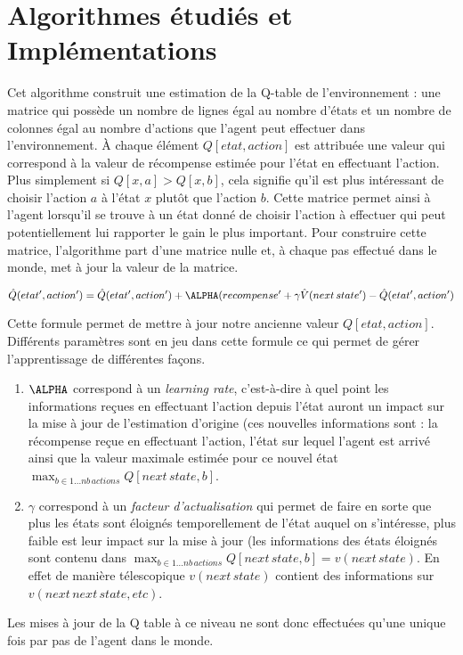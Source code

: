 \documentclass{article}
\begin{document}
\section{Algorithmes étudiés et Implémentations}
Cet algorithme construit une estimation de la Q-table de l’environnement : une matrice qui possède un nombre de lignes égal au nombre d’états et un nombre de colonnes égal au nombre d’actions que l’agent peut effectuer dans l’environnement. À chaque élément $Q[etat, action]$ est attribuée une valeur qui correspond à la valeur de récompense estimée pour l’état en effectuant l’action. Plus simplement si $Q[x,a] > Q[x,b]$, cela signifie qu’il est plus intéressant de choisir l’action $a$ à l’état $x$ plutôt que l’action $b$. 
Cette matrice permet ainsi à l’agent lorsqu’il se trouve à un état donné de choisir l’action à effectuer qui peut potentiellement lui rapporter le gain le plus important. Pour construire cette matrice, l’algorithme part d’une matrice nulle et, à chaque pas effectué dans le monde, met à jour la valeur de la matrice.

$$\hat{Q}(etat',action')=\hat{Q}(etat',action')+\ALPHA(recompense'+\gamma\hat{V}(next\,state')-\hat{Q}(etat',action')$$    %

Cette formule permet de mettre à jour notre ancienne valeur $Q[etat, action]$. Différents paramètres sont en jeu dans cette formule ce qui permet de gérer l’apprentissage de différentes façons. 
\begin{enumerate}
    \item $\ALPHA$ correspond à un \textit{learning rate}, c'est-à-dire à quel point les informations reçues en effectuant l’action depuis l’état auront un impact sur la mise à jour de l’estimation d’origine (ces nouvelles informations sont : la récompense reçue en effectuant l’action, l’état sur lequel l’agent est arrivé ainsi que la valeur maximale estimée pour ce nouvel état $\max_{b\in1...nb\,actions}Q[next\,state,b]$. 
    \item $\gamma$ correspond à un \textit{facteur d'actualisation} qui permet de faire en sorte que plus les états sont éloignés temporellement de l’état auquel on s’intéresse, plus faible est leur impact sur la mise à jour (les informations des états éloignés sont contenu dans $\max_{b\in1...nb\,actions}Q[next\,state,b]=v(next\,state)$. En effet de manière télescopique $v(next\,state)$ contient des informations sur $v(next\,next\,state, etc)$. 
\end{enumerate}

Les mises à jour de la Q table à ce niveau ne sont donc effectuées qu’une unique fois par pas de l’agent dans le monde. 
\end{document}
